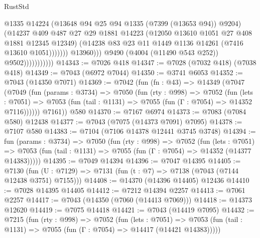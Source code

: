 \begin{lexlean}{RustStd}
\begin{coremodule}
                                        @1335
                                        @14224
                                        (@13648 @94 @25 @94 @1335 (@7399 (@13653 @94)) @9204)
                                        (@14237
                                          @409
                                          @487
                                          @27
                                          @29
                                          @1881
                                          @14223
                                          (@12050 @13610 @1051 @27 @408 @1881 @12345 @12349)
                                          (@14238
                                            @83
                                            @23
                                            @11
                                            @1449
                                            @1136
                                            @14261
                                            (@7416 @13610 @1051)))))))
                                @13960)))
                          @9490
                          (@4004 (@11490 @543 @252))
                          @9502)))))))))))
@14343 := @7026 @418
@14347 := @7028 (@7032 @418) (@7038 @418)
@14349 := @7043 (@6972 @7044)
@14350 := @3741 @6053
@14352 := @7043 (@14350 @7071)
@14369 := @7042
    (fun (fn : @43) =>
    @14349
      (@7047
        (@7049
          (fun (params : @3734) =>
          @7050
            (fun (rty : @998) =>
            @7052
              (fun (lets : @7051) =>
              @7053 (fun (tail : @1131) => @7055 (fun (Γ : @7054) => @14352 @7116))))))
        @7161))
    @580
@14370 := @7167 @6974
@14373 := @7083 (@7084 @580) @12438
@14377 := @7043 (@7075 (@14373 @7091) @7095)
@14378 := @7107 @580
@14383 := @7104 (@7106 @14378 @12441 @3745 @3748)
@14394 := fun (params : @3734) =>
  @7050
    (fun (rty : @998) =>
    @7052
      (fun (lets : @7051) =>
      @7053 (fun (tail : @1131) => @7055 (fun (Γ : @7054) => @14352 (@14377 @14383)))))
@14395 := @7049 @14394
@14396 := @7047 @14395
@14405 := @7130
    (fun (U : @7129) => @7131 (fun (t : @7) => @7138 (@7043 (@7144 @12438 @3751) @7155)))
@14408 := @14370 (@14396 @14405) @12436
@14410 := @7028 @14395 @14405
@14412 := @7212 @14394 @2257
@14413 := @7061 @2257
@14417 := @7043 (@14350 (@7060 (@14413 @7069)))
@14418 := @14373 @12620
@14419 := @7075 @14418
@14421 := @7043 (@14419 @7095)
@14432 := @7215
    (fun (rty : @998) =>
    @7052
      (fun (lets : @7051) =>
      @7053 (fun (tail : @1131) => @7055 (fun (Γ : @7054) => @14417 (@14421 @14383)))))

\end{coremodule}
\end{lexlean}
